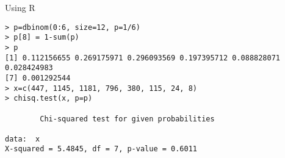 \documentclass[smaller]{beamer}
\begin{document}
\begin{frame}[fragile]{Using R}
 \begin{verbatim}
> p=dbinom(0:6, size=12, p=1/6)                                                                                                                                                                                                                                                
> p[8] = 1-sum(p)
> p
[1] 0.112156655 0.269175971 0.296093569 0.197395712 0.088828071 0.028424983                                                                                                                                                                                                    
[7] 0.001292544                                                                                                                                                                                                                                                                
> x=c(447, 1145, 1181, 796, 380, 115, 24, 8)
> chisq.test(x, p=p)                                                                                                                                                                                                                                                
                                                                                                                                                                                                                                                                               
        Chi-squared test for given probabilities                                                                                                                                                                                                                               
                                                                                                                                                                                                                                                                               
data:  x                                                                                                                                                                                                                                                                       
X-squared = 5.4845, df = 7, p-value = 0.6011                                                                                                                                                                                                                                   
     
 \end{verbatim}
\end{frame}
\end{document}
